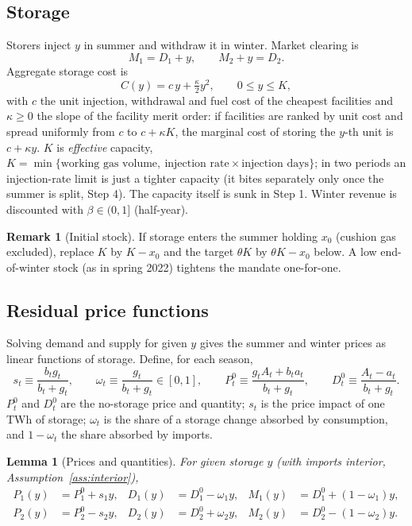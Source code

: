 \documentclass[11pt]{article}
\newtheorem{lemma}{Lemma}
\theoremstyle{definition}
\newtheorem{remark}{Remark}
\begin{document}
\subsection{Storage}
Storers inject $y$ in summer and withdraw it in winter. Market clearing is
\begin{equation}
M_1 = D_1 + y, \qquad M_2 + y = D_2 .
\end{equation}
Aggregate storage cost is
\begin{equation}
C(y) = c\,y + \tfrac{\kappa}{2}y^{2}, \qquad 0\le y \le K,
\end{equation}
with $c$ the unit injection, withdrawal and fuel cost of the cheapest facilities and $\kappa\ge 0$ the
slope of the facility merit order: if facilities are ranked by unit cost and spread uniformly
from $c$ to $c+\kappa K$, the marginal cost of storing the $y$-th unit is $c+\kappa y$. $K$ is
\emph{effective} capacity, $K=\min\{\text{working gas volume},\ \text{injection rate}\times
\text{injection days}\}$; in two periods an injection-rate limit is just a tighter capacity (it bites
separately only once the summer is split, Step 4). The capacity itself is sunk in Step 1.
Winter revenue is discounted with $\beta\in(0,1]$ (half-year).

\begin{remark}[Initial stock]
If storage enters the summer holding $x_0$ (cushion gas excluded), replace $K$ by $K-x_0$ and the
target $\theta K$ by $\theta K-x_0$ below. A low end-of-winter stock (as in spring 2022) tightens the
mandate one-for-one.
\end{remark}

\subsection{Residual price functions}
Solving demand and supply for given $y$ gives the summer and winter prices as linear functions of
storage. Define, for each season,
\begin{equation}
s_t \equiv \frac{b_t g_t}{b_t+g_t}, \qquad
\omega_t \equiv \frac{g_t}{b_t+g_t}\in[0,1],\qquad
P^0_t \equiv \frac{g_tA_t+b_ta_t}{b_t+g_t}, \qquad D^0_t\equiv \frac{A_t-a_t}{b_t+g_t}.
\end{equation}
$P^0_t$ and $D^0_t$ are the no-storage price and quantity; $s_t$ is the price impact of one TWh of
storage; $\omega_t$ is the share of a storage change absorbed by consumption, and $1-\omega_t$ the
share absorbed by imports.

\begin{lemma}[Prices and quantities]\label{lem:prices}
For given storage $y$ (with imports interior, Assumption~\ref{ass:interior}),
\begin{align}
P_1(y) &= P^0_1 + s_1 y, & D_1(y) &= D^0_1-\omega_1 y, & M_1(y) &= D^0_1+(1-\omega_1)y,\\
P_2(y) &= P^0_2 - s_2 y, & D_2(y) &= D^0_2+\omega_2 y, & M_2(y) &= D^0_2-(1-\omega_2)y.
\end{align}
\end{lemma}
\end{document}
